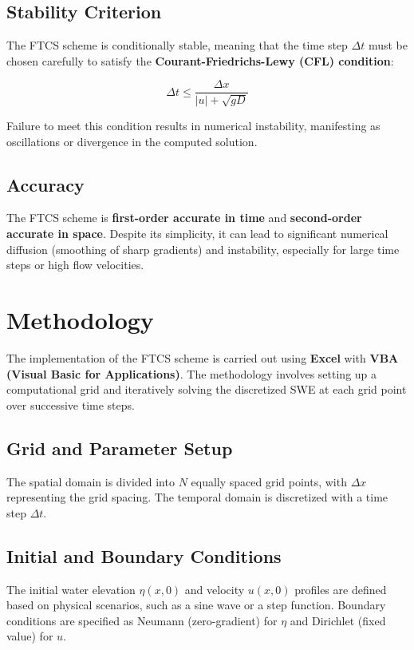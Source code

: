 \documentclass[12pt]{article}
\begin{document}
\subsection{Stability Criterion}
The FTCS scheme is conditionally stable, meaning that the time step \( \Delta t \) must be chosen carefully to satisfy the \textbf{Courant-Friedrichs-Lewy (CFL) condition}:

\begin{equation}
\Delta t \leq \frac{\Delta x}{|u| + \sqrt{gD}}
\end{equation}

Failure to meet this condition results in numerical instability, manifesting as oscillations or divergence in the computed solution.

\subsection{Accuracy}
The FTCS scheme is \textbf{first-order accurate in time} and \textbf{second-order accurate in space}. Despite its simplicity, it can lead to significant numerical diffusion (smoothing of sharp gradients) and instability, especially for large time steps or high flow velocities.

\section{Methodology}

The implementation of the FTCS scheme is carried out using \textbf{Excel} with \textbf{VBA (Visual Basic for Applications)}. The methodology involves setting up a computational grid and iteratively solving the discretized SWE at each grid point over successive time steps.

\subsection{Grid and Parameter Setup}
The spatial domain is divided into \( N \) equally spaced grid points, with \( \Delta x \) representing the grid spacing. The temporal domain is discretized with a time step \( \Delta t \).

\subsection{Initial and Boundary Conditions}
The initial water elevation \( \eta(x, 0) \) and velocity \( u(x, 0) \) profiles are defined based on physical scenarios, such as a sine wave or a step function. Boundary conditions are specified as Neumann (zero-gradient) for \( \eta \) and Dirichlet (fixed value) for \( u \).
\end{document}
